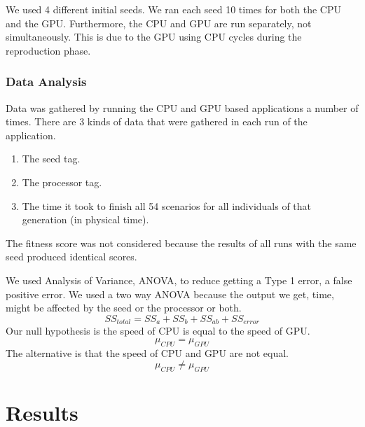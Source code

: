 \documentclass{acm_proc_article-sp}
\begin{document}
We used 4 different initial seeds. We ran each seed 10 times for both the CPU and 
the GPU. Furthermore, the CPU and GPU are run separately, not simultaneously. This
is due to the GPU using CPU cycles during the reproduction phase.

\subsubsection{Data Analysis}
Data was gathered by running the CPU and GPU based applications a number of
times. There are 3 kinds of data that were gathered in each run of the application.
\begin{enumerate}
  \item The seed tag.
  \item The processor tag.
  \item The time it took to finish all 54 scenarios for all individuals of 
that generation (in physical time).
\end{enumerate}
The fitness score was not considered because the results of all runs with the
same seed produced identical scores.


We used Analysis of Variance, ANOVA, to reduce getting a Type 1 error, a false
positive error. We used a two way ANOVA because the output we get, time, might
be affected by the seed or the processor or both.
$$
SS_{total} = SS_a + SS_b + SS_{ab} + SS_{error}
$$
Our null hypothesis is the speed of CPU is equal to the speed of GPU.
$$
\mu_{CPU} = \mu_{GPU}
$$
The alternative is that the speed of CPU and GPU are not equal.
$$
\mu_{CPU} \neq \mu_{GPU}
$$

\section{Results}
\end{document}
